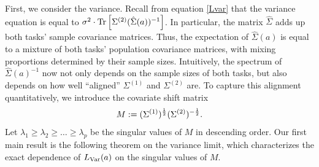 First, we consider the variance. Recall from equation \eqref{Lvar} that the variance equation is equal to $\sigma^2 \cdot \operatorname{Tr}\left[\Sigma^{(2)} (\hat\Sigma(a))^{-1}\right]$.
In particular, the matrix $\hat{\Sigma}$ adds up both tasks' sample covariance matrices.
Thus, the expectation of $\hat{\Sigma}(a)$ is equal to a mixture of both tasks' population covariance matrices, with mixing proportions determined by their sample sizes.
Intuitively, the spectrum of $\hat{\Sigma}(a)^{-1}$ now not only depends on the sample sizes of both tasks, but also depends on how well ``aligned'' $\Sigma^{(1)}$ and $\Sigma^{(2)}$ are.
To capture this alignment quantitatively, we introduce the covariate shift matrix %
$$ M := (\Sigma^{(1)})^{\frac 1 2}(\Sigma^{(2)})^{-\frac 1 2}.$$
Let $\lambda_1 \ge \lambda_2 \ge \dots\ge \lambda_p $ be the singular values of $M$ in descending order. %
Our first main result is the following theorem on the variance limit, which characterizes the exact dependence of $L_{\operatorname{Var}}(a)$ on the singular values of $M$.


